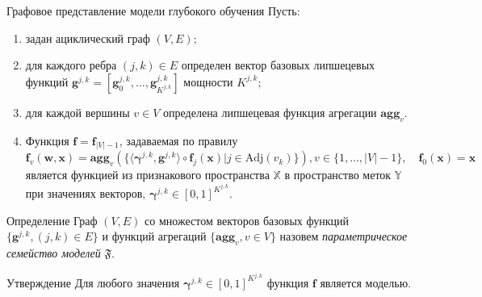 \documentclass[usenames,dvipsnames,11pt,pdf,utf8,russian,aspectratio=43]{beamer}
\begin{document}
\begin{frame}{Графовое представление модели глубокого обучения}
\footnotesize
Пусть:
\begin{enumerate}
 \item задан ациклический граф $(V,E)$;
\item для каждого ребра $(j,k) \in E$ определен вектор базовых липшецевых функций  $\mathbf{g}^{j,k} = [\mathbf{g}^{j,k}_0, \dots, \mathbf{g}^{j,k}_{K^{j,k}}]$  мощности $K^{j,k}$;
\item для каждой вершины $v \in V$ определена липшецевая функция агрегации $\textbf{agg}_v$.
\item Функция $\mathbf{f} = \mathbf{f}_{|V|-1}$, задаваемая по правилу 
\begin{equation}
\label{eq:modelfam}
    \mathbf{f}_{v}(\mathbf{w}, \mathbf{x}) = \textbf{agg}_{v}\left(\{ \langle \boldsymbol{\gamma}^{j,k}, \mathbf{g}^{j,k} \rangle \circ  \mathbf{f}_j(\mathbf{x})| j \in \text{Adj}(v_k)\}\right), v \in \{1,\dots,|V|-1\}, \quad \mathbf{f}_0(\mathbf{x}) = \mathbf{x}
\end{equation}
является функцией из признакового пространства $\mathbb{X}$ в пространство меток $\mathbb{Y}$ при значениях векторов, $\boldsymbol{\gamma}^{j,k} \in [0,1]^{K^{j,k}}$.
\end{enumerate}

\begin{block}{Определение}
Граф $(V, E)$ со множестом векторов базовых функций $\{\mathbf{g}^{j,k}, (j,k) \in E\}$ и функций агрегаций $\{ \textbf{agg}_v, {v \in V}\}$ назовем \textit{параметрическое семейство моделей} $\mathfrak{F}$.
\end{block}
\begin{block}{Утверждение}
Для любого значения $\boldsymbol{\gamma}^{j,k} \in [0,1]^{K^{j,k}}$ функция $\mathbf{f}$ является моделью.
\end{block}
\end{frame}

      
\end{document}
